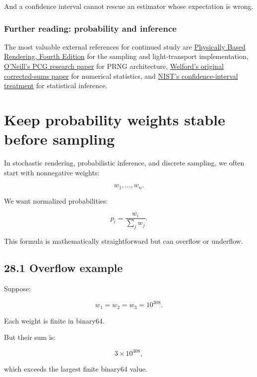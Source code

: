 And a confidence interval cannot rescue an estimator whose expectation is wrong.

\subsubsection{Further reading: probability and inference}\label{02-foundations-ii-ch031-further-reading-probability-and-inference}

The most valuable external references for continued study are \href{https://pbr-book.org/4ed/?utm_source=chatgpt.com}{Physically Based Rendering, Fourth Edition} for the sampling and light-transport implementation, \href{https://www.pcg-random.org/paper.html?utm_source=chatgpt.com}{O'Neill's PCG research paper} for PRNG architecture, \href{https://doi.org/10.1080/00401706.1962.10490022?utm_source=chatgpt.com}{Welford's original corrected-sums paper} for numerical statistics, and \href{https://www.itl.nist.gov/div898/handbook/eda/section3/eda352.htm?utm_source=chatgpt.com}{NIST's confidence-interval treatment} for statistical inference.

\section{Keep probability weights stable before sampling}\label{02-foundations-ii-ch031-keep-probability-weights-stable-before-sampling}

In stochastic rendering, probabilistic inference, and discrete sampling, we often start with nonnegative weights:

\[ w_1,\ldots,w_n. \]

We want normalized probabilities:

\[ \boxed{ p_i=\frac{w_i}{\sum_jw_j} }. \]

This formula is mathematically straightforward but can overflow or underflow.

\subsection{28.1 Overflow example}\label{02-foundations-ii-ch031-overflow-example}

Suppose:

\[ w_1=w_2=w_3=10^{308}. \]

Each weight is finite in binary64.

But their sum is:

\[ 3\times10^{308}, \]

which exceeds the largest finite binary64 value.

